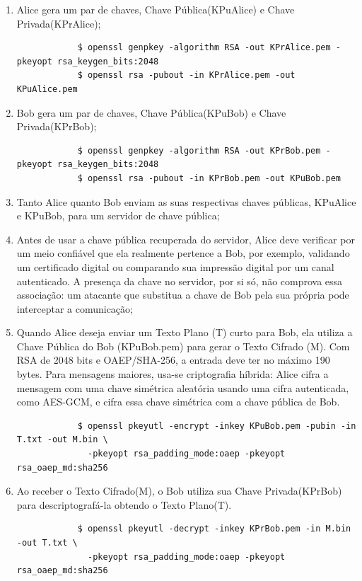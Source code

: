 \documentclass{article}
\begin{document}
\begin{enumerate}
	\item Alice gera um par de chaves, Chave Pública(KPuAlice) e Chave Privada(KPrAlice);
	\begin{tcolorbox}[width=\textwidth]
		{\normalsize
			\begin{verbatim}
			$ openssl genpkey -algorithm RSA -out KPrAlice.pem -pkeyopt rsa_keygen_bits:2048
			$ openssl rsa -pubout -in KPrAlice.pem -out KPuAlice.pem
			\end{verbatim}
		}
	\end{tcolorbox}
	\item Bob gera um par de chaves, Chave Pública(KPuBob) e Chave Privada(KPrBob);
	\begin{tcolorbox}[width=\textwidth]
		{\normalsize
			\begin{verbatim}
			$ openssl genpkey -algorithm RSA -out KPrBob.pem -pkeyopt rsa_keygen_bits:2048
			$ openssl rsa -pubout -in KPrBob.pem -out KPuBob.pem
			\end{verbatim}
		}
	\end{tcolorbox}
	\item Tanto Alice quanto Bob enviam as suas respectivas chaves públicas, KPuAlice e KPuBob, para um servidor de chave pública;
	\item Antes de usar a chave pública recuperada do servidor, Alice deve verificar por um meio confiável que ela realmente pertence a Bob, por exemplo, validando um certificado digital ou comparando sua impressão digital por um canal autenticado. A presença da chave no servidor, por si só, não comprova essa associação: um atacante que substitua a chave de Bob pela sua própria pode interceptar a comunicação;
	\item Quando Alice deseja enviar um Texto Plano (T) curto para Bob, ela utiliza a Chave Pública do Bob (KPuBob.pem) para gerar o Texto Cifrado (M). Com RSA de 2048 bits e OAEP/SHA-256, a entrada deve ter no máximo 190 bytes. Para mensagens maiores, usa-se criptografia híbrida: Alice cifra a mensagem com uma chave simétrica aleatória usando uma cifra autenticada, como AES-GCM, e cifra essa chave simétrica com a chave pública de Bob.
	\begin{tcolorbox}[width=\textwidth]
		{\normalsize
			\begin{verbatim}
			$ openssl pkeyutl -encrypt -inkey KPuBob.pem -pubin -in T.txt -out M.bin \
			  -pkeyopt rsa_padding_mode:oaep -pkeyopt rsa_oaep_md:sha256
			\end{verbatim}
		}
	\end{tcolorbox}
	\item Ao receber o Texto Cifrado(M), o Bob utiliza sua Chave Privada(KPrBob) para descriptografá-la obtendo o Texto Plano(T).
	\begin{tcolorbox}[width=\textwidth]
		{\normalsize
			\begin{verbatim}
			$ openssl pkeyutl -decrypt -inkey KPrBob.pem -in M.bin -out T.txt \
			  -pkeyopt rsa_padding_mode:oaep -pkeyopt rsa_oaep_md:sha256
			\end{verbatim}
		}
	\end{tcolorbox}
\end{enumerate}
\end{document}
